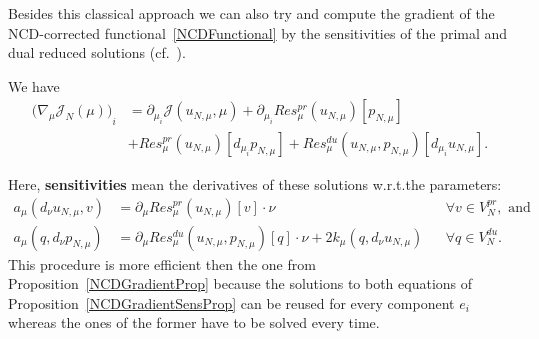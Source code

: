 Besides this classical approach we can also try and compute the gradient of the NCD-corrected functional~\eqref{NCDFunctional} by the sensitivities of the primal and dual reduced solutions (cf.~\cite[Proposition 3.9]{Keil2021}).
\begin{proposition}\label{NCDGradientSensProp}
    We have
    \begin{align*}\label{NCDGradientSens}
        {\big( \nabla_\mu \mathcal{J}_N(\mu) \big)}_i &= \partial_{\mu_i} \mathcal{J}(u_{N, \mu}, \mu) + \partial_{\mu_i} Res_\mu^{pr}(u_{N, \mu})[p_{N, \mu}] \\
        &+ Res_\mu^{pr}(u_{N, \mu})[d_{\mu_i} p_{N, \mu}] + Res_\mu^{du}(u_{N, \mu}, p_{N, \mu})[d_{\mu_i} u_{N, \mu}].
    \end{align*}
\end{proposition}
Here, \textbf{sensitivities} mean the derivatives of these solutions w.r.t.\@ the parameters:
\begin{align*}
    a_\mu(d_\nu u_{N, \mu}, v) &= \partial_\mu Res_\mu^{pr}(u_{N, \mu})[v] \cdot \nu &&\forall v \in V_N^{pr}, \text{ and} \\
    a_\mu(q, d_\nu p_{N, \mu}) &= \partial_\mu Res_\mu^{du}(u_{N, \mu}, p_{N, \mu})[q] \cdot \nu + 2 k_\mu(q, d_\nu u_{N, \mu}) &&\forall q \in V_N^{du}.
\end{align*}
This procedure is more efficient then the one from Proposition~\ref{NCDGradientProp} because the solutions to both equations of Proposition~\ref{NCDGradientSensProp} can be reused for every component $e_i$ whereas the ones of the former have to be solved every time.

